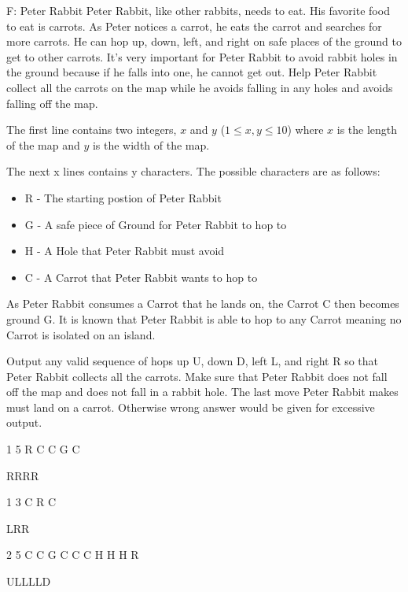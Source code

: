 \begin{problem}{F: Peter Rabbit}
Peter Rabbit, like other rabbits, needs to eat. His favorite food to eat is carrots.
As Peter notices a carrot, he eats the carrot and searches for more carrots.
He can hop up, down, left, and right on safe places of the ground to get to other carrots.
It's very important for Peter Rabbit to avoid rabbit holes in the ground because if he falls into one, he cannot get out.
Help Peter Rabbit collect all the carrots on the map while he avoids falling in any holes and avoids falling off the map.
\end{problem}

\begin{formalin}
The first line contains two integers, $x$ and $y$ ($1 \leq x, y \leq 10$) where $x$ is the length of the map and $y$ is the width of the map.

The next x lines contains y characters. The possible characters are as follows:
\begin{itemize}
\item R - The starting postion of Peter Rabbit
\item G - A safe piece of Ground for Peter Rabbit to hop to
\item H - A Hole that Peter Rabbit must avoid
\item C - A Carrot that Peter Rabbit wants to hop to
\end{itemize}

As Peter Rabbit consumes a Carrot that he lands on, the Carrot C then becomes ground G.
It is known that Peter Rabbit is able to hop to any Carrot meaning no Carrot is isolated on an island.
\end{formalin}

\begin{formalout}
Output any valid sequence of hops up U, down D, left L, and right R so that Peter Rabbit collects all the carrots.
Make sure that Peter Rabbit does not fall off the map and does not fall in a rabbit hole.
The last move Peter Rabbit makes must land on a carrot. Otherwise wrong answer would be given for excessive output.
\end{formalout}

\begin{datain}
1 5
R C C G C
\end{datain}
\begin{dataout}
RRRR
\end{dataout}

\begin{datain}
1 3
C R C
\end{datain}
\begin{dataout}
LRR
\end{dataout}

\begin{datain}
2 5
C C G C C
C H H H R
\end{datain}
\begin{dataout}
ULLLLD
\end{dataout}
